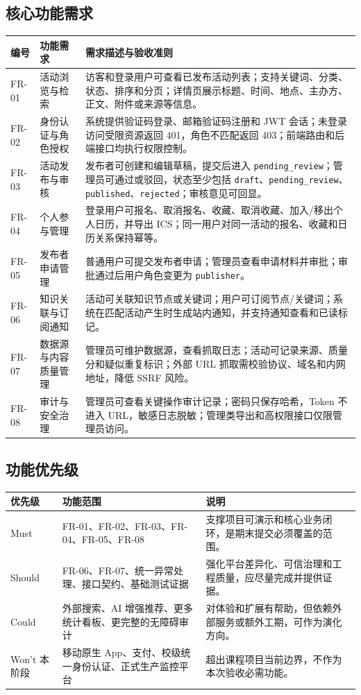\documentclass[12pt,a4paper]{ctexart}
\begin{document}
  \subsection{核心功能需求}
  \begin{longtable}{p{1.2cm}p{2.9cm}p{7.5cm}}
  \toprule 编号 & 功能需求 & 需求描述与验收准则 \\\midrule\endhead
  FR-01 & 活动浏览与检索 & 访客和登录用户可查看已发布活动列表；支持关键词、分类、状态、排序和分页；详情页展示标题、时间、地点、主办方、正文、附件或来源等信息。 \\
  FR-02 & 身份认证与角色授权 & 系统提供验证码登录、邮箱验证码注册和 JWT 会话；未登录访问受限资源返回 401，角色不匹配返回 403；前端路由和后端接口均执行权限控制。 \\
  FR-03 & 活动发布与审核 & 发布者可创建和编辑草稿，提交后进入 \texttt{pending\_review}；管理员可通过或驳回，状态至少包括 \texttt{draft}、\texttt{pending\_review}、\texttt{published}、\texttt{rejected}；审核意见可回显。 \\
  FR-04 & 个人参与管理 & 登录用户可报名、取消报名、收藏、取消收藏、加入/移出个人日历，并导出 ICS；同一用户对同一活动的报名、收藏和日历关系保持幂等。 \\
  FR-05 & 发布者申请管理 & 普通用户可提交发布者申请；管理员查看申请材料并审批；审批通过后用户角色变更为 \texttt{publisher}。 \\
  FR-06 & 知识关联与订阅通知 & 活动可关联知识节点或关键词；用户可订阅节点/关键词；系统在匹配活动产生时生成站内通知，并支持通知查看和已读标记。 \\
  FR-07 & 数据源与内容质量管理 & 管理员可维护数据源，查看抓取日志；活动可记录来源、质量分和疑似重复标识；外部 URL 抓取需校验协议、域名和内网地址，降低 SSRF 风险。 \\
  FR-08 & 审计与安全治理 & 管理员可查看关键操作审计记录；密码只保存哈希，Token 不进入 URL，敏感日志脱敏；管理类导出和高权限接口仅限管理员访问。 \\
  \bottomrule
  \end{longtable}

  \subsection{功能优先级}
  \noindent\begin{tabularx}{\textwidth}{p{2.2cm}Y Y}
  \toprule 优先级 & 功能范围 & 说明 \\\midrule
  Must & FR-01、FR-02、FR-03、FR-04、FR-05、FR-08 & 支撑项目可演示和核心业务闭环，是期末提交必须覆盖的范围。 \\
  Should & FR-06、FR-07、统一异常处理、接口契约、基础测试证据 & 强化平台差异化、可信治理和工程质量，应尽量完成并提供证据。 \\
  Could & 外部搜索、AI 增强推荐、更多统计看板、更完整的无障碍审计 & 对体验和扩展有帮助，但依赖外部服务或额外工期，可作为演化方向。 \\
  Won't 本阶段 & 移动原生 App、支付、校级统一身份认证、正式生产监控平台 & 超出课程项目当前边界，不作为本次验收必需功能。 \\
  \bottomrule
  \end{tabularx}
\end{document}
